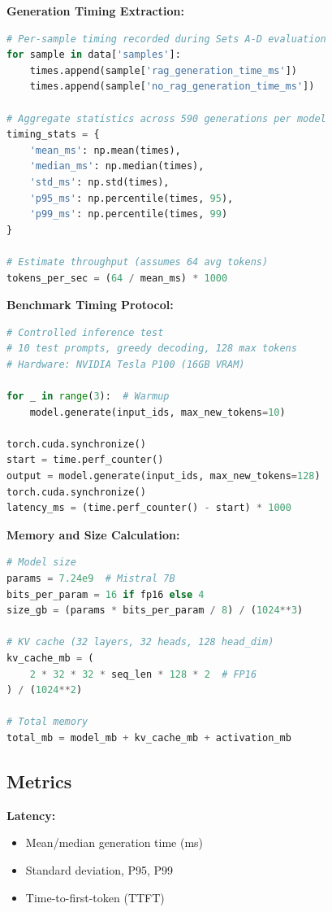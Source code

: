 \documentclass[11pt,a4paper]{article}
\begin{document}
\textbf{Generation Timing Extraction:}
\begin{lstlisting}[language=Python]
# Per-sample timing recorded during Sets A-D evaluation
for sample in data['samples']:
    times.append(sample['rag_generation_time_ms'])
    times.append(sample['no_rag_generation_time_ms'])

# Aggregate statistics across 590 generations per model
timing_stats = {
    'mean_ms': np.mean(times),
    'median_ms': np.median(times),
    'std_ms': np.std(times),
    'p95_ms': np.percentile(times, 95),
    'p99_ms': np.percentile(times, 99)
}

# Estimate throughput (assumes 64 avg tokens)
tokens_per_sec = (64 / mean_ms) * 1000
\end{lstlisting}

\textbf{Benchmark Timing Protocol:}
\begin{lstlisting}[language=Python]
# Controlled inference test
# 10 test prompts, greedy decoding, 128 max tokens
# Hardware: NVIDIA Tesla P100 (16GB VRAM)

for _ in range(3):  # Warmup
    model.generate(input_ids, max_new_tokens=10)

torch.cuda.synchronize()
start = time.perf_counter()
output = model.generate(input_ids, max_new_tokens=128)
torch.cuda.synchronize()
latency_ms = (time.perf_counter() - start) * 1000
\end{lstlisting}

\textbf{Memory and Size Calculation:}
\begin{lstlisting}[language=Python]
# Model size
params = 7.24e9  # Mistral 7B
bits_per_param = 16 if fp16 else 4
size_gb = (params * bits_per_param / 8) / (1024**3)

# KV cache (32 layers, 32 heads, 128 head_dim)
kv_cache_mb = (
    2 * 32 * 32 * seq_len * 128 * 2  # FP16
) / (1024**2)

# Total memory
total_mb = model_mb + kv_cache_mb + activation_mb
\end{lstlisting}

\subsection{Metrics}

\textbf{Latency:}
\begin{itemize}
\item Mean/median generation time (ms)
\item Standard deviation, P95, P99
\item Time-to-first-token (TTFT)
\end{itemize}
\end{document}
